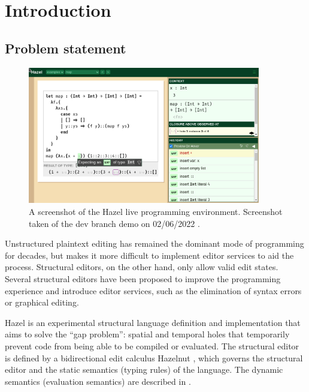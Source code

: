 \chapter{Introduction}
\label{sec:introduction}

\section{Problem statement}
\label{sec:prob_stmt}

\begin{figure}
  \centering
  \includegraphics[width=4in]{img/hazel_ui.png}
  \caption[Screenshot of the Hazel live programming environment.]{A screenshot of the Hazel live programming environment. Screenshot taken of the dev branch demo on 02/06/2022 \cite{HazelDemo2022}.}
  \label{fig:screenshot-hazel-ui}
\end{figure}

Unstructured plaintext editing has remained the dominant mode of programming for decades, but makes it more difficult to implement editor services to aid the process. Structural editors, on the other hand, only allow valid edit states. Several structural editors  have been proposed to improve the programming experience and introduce editor services, such as the elimination of syntax errors or graphical editing.

Hazel \cite{Hazel2022} is an experimental structural language definition and implementation that aims to solve the ``gap problem'': spatial and temporal holes that temporarily prevent code from being able to be compiled or evaluated. The structural editor is defined by a bidirectional edit calculus Hazelnut \cite{conf/popl/Hazelnut17}, which governs the structural editor and the static semantics (typing rules) of the language. The dynamic semantics (evaluation semantics) are described in \cite{conf/popl/HazelnutLive19}.

